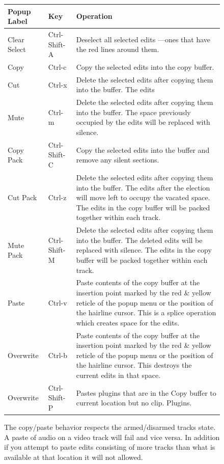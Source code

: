 \begin{figure}
\begin{center}
    \begin{longtable}{l l p{11cm}}
        \toprule
        \textbf{Popup Label} & \textbf{Key} & \textbf{Operation} \\ \midrule
        \endhead
        Clear Select & Ctrl-Shift-A & Deselect all selected edits ---ones that have the red lines around them. \\
        Copy & Ctrl-c & Copy the selected edits into the copy buffer. \\
        Cut & Ctrl-x & Delete the selected edits after copying them into the buffer.  The edits \\
        Mute & Ctrl-m & Delete the selected edits after copying them into the buffer.  The space
        previously occupied by the edits will be replaced with silence.\\
        Copy Pack & Ctrl-Shift-C & Copy the selected edits into the buffer and remove any silent sections.\\
        Cut Pack &	Ctrl-z	&	Delete the selected edits after copying them into the buffer.  The edits after the election will move left to occupy the vacated space.  The edits in the copy buffer will be packed together within each track. \\
        Mute Pack &	Ctrl-Shift-M &	Delete the selected edits after copying them into the buffer.  The deleted
        edits will be replaced with silence.  The edits in the copy buffer will be packed together within each track. \\
        Paste 	&	Ctrl-v	&	Paste contents of the copy buffer at the insertion point marked by the red \& yellow reticle of the popup menu or the position of the hairline cursor.
        This is a splice operation which creates space for the edits. \\
        Overwrite &	Ctrl-b	&	Paste contents of the copy buffer at the insertion point marked by the red \& yellow reticle of the popup menu or the position of the hairline cursor.
        This destroys the current edits in that space. \\
        Overwrite &	Ctrl-Shift-P &	Pastes plugins that are in the Copy buffer to current location but no clip.
        Plugins. \\ \bottomrule
    \end{longtable}
\end{center}
The copy/paste behavior respects the armed/disarmed tracks state.  A paste of audio on a video track will fail and vice versa.  In addition if you attempt to paste edits consisting of more tracks than what is available at that location it will not allowed.


\end{figure}
